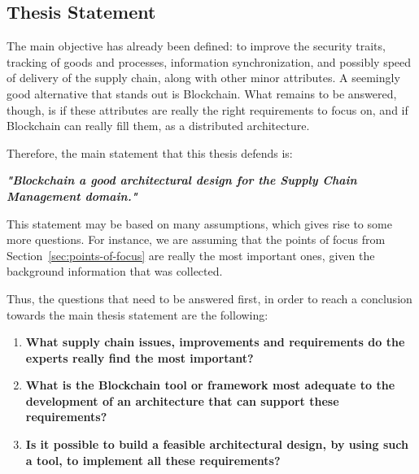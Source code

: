 \subsection{Thesis Statement}
\label{subsec:thesis-statement}
The main objective has already been defined: to improve the security traits, tracking of goods and processes, information synchronization, and possibly speed of delivery of the supply chain, along with other minor attributes. A seemingly good alternative that stands out is Blockchain. What remains to be answered, though, is if these attributes are really the right requirements to focus on, and if Blockchain can really fill them, as a distributed architecture.


Therefore, the main statement that this thesis defends is: 

\par \textbf{\textit{"Blockchain a good architectural design for the Supply Chain Management domain."}}


This statement may be based on many assumptions, which gives rise to some more questions. For instance, we are assuming that the points of focus from Section~\ref{sec:points-of-focus} are really the most important ones, given the background information that was collected.

Thus, the questions that need to be answered first, in order to reach a conclusion towards the main thesis statement are the following:
\begin{enumerate}
\item \textbf{What supply chain issues, improvements and requirements do the experts really find the most important?}
\item \textbf{What is the Blockchain tool or framework most adequate to the development of an architecture that can support these requirements?}
\item \textbf{Is it possible to build a feasible architectural design, by using such a tool, to implement all these requirements?}
\end{enumerate}

